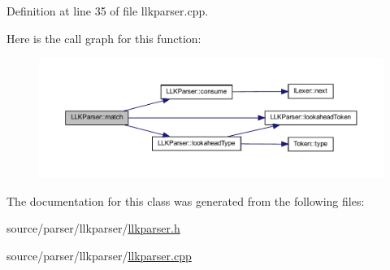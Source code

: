 Definition at line 35 of file llkparser.cpp.



Here is the call graph for this function:
\nopagebreak
\begin{figure}[H]
\begin{center}
\leavevmode
\includegraphics[width=400pt]{class_l_l_k_parser_adefd01a8ab2f64530cf3918fc74885a6_cgraph}
\end{center}
\end{figure}




The documentation for this class was generated from the following files:\begin{DoxyCompactItemize}
\item 
source/parser/llkparser/\hyperlink{llkparser_8h}{llkparser.h}\item 
source/parser/llkparser/\hyperlink{llkparser_8cpp}{llkparser.cpp}\end{DoxyCompactItemize}
